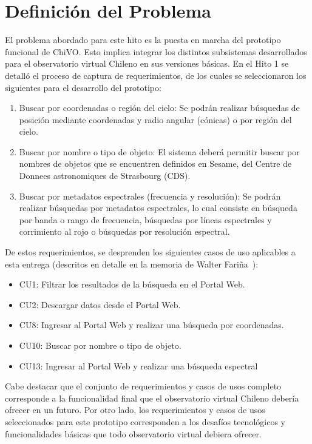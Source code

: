 \section{Definición del Problema}

El problema abordado para este hito es la puesta en marcha
del prototipo funcional de ChiVO. Esto implica integrar los
distintos subsistemas desarrollados para el observatorio
virtual Chileno en sus versiones básicas. En el Hito 1 
se detalló el proceso de captura de requerimientos, de 
los cuales se seleccionaron los siguientes para el 
desarrollo del prototipo:

\begin{enumerate}
\item Buscar por coordenadas o región del cielo:
Se podrán realizar búsquedas de posición mediante coordenadas y radio angular
(cónicas) o por región del cielo.
\item Buscar por nombre o tipo de objeto:
El sistema deberá permitir buscar por nombres de objetos que se encuentren
definidos en Sesame, del Centre de Donnees astronomiques de Strasbourg (CDS).
\item Buscar por metadatos espectrales (frecuencia y resolución): 
Se podrán realizar búsquedas por metadatos espectrales, lo cual consiste en
búsqueda por banda o rango de frecuencia, búsquedas por líneas espectrales y 
corrimiento al rojo o búsquedas por resolución espectral.
\end{enumerate}

De estos requerimientos, se desprenden los siguientes casos 
de uso aplicables a esta entrega
(descritos en detalle en la memoria de Walter Fariña~\cite{}):
\begin{itemize}
\item CU1: Filtrar los resultados de la búsqueda en el Portal Web.
\item CU2: Descargar datos desde el Portal Web.
\item CU8: Ingresar al Portal Web y realizar una búsqueda por coordenadas.
\item CU10: Buscar por nombre o tipo de objeto.
\item CU13: Ingresar al Portal Web y realizar una búsqueda espectral
\end{itemize}

Cabe destacar que el conjunto de requerimientos y casos de usos completo
corresponde a la funcionalidad final que el observatorio virtual Chileno
debería ofrecer en un futuro. Por otro lado, los requerimientos y casos de usos seleccionados
para este prototipo corresponden a los desafíos tecnológicos y funcionalidades
básicas que todo observatorio virtual debiera ofrecer.

